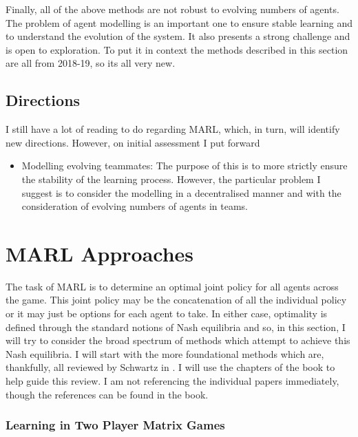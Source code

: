 \documentclass[preprint,8pt]{report}
\begin{document}
Finally, all of the above methods are not robust to evolving numbers of agents. The problem of agent modelling is an important one to ensure stable learning and to understand the evolution of the system. It also presents a strong challenge and is open to exploration. To put it in context the methods described in this section are all from 2018-19, so its all very new.

\subsection{Directions}

I still have a lot of reading to do regarding MARL, which, in turn, will identify new directions. However, on initial assessment I put forward

\begin{itemize}
    \item Modelling evolving teammates: The purpose of this is to more strictly ensure the stability of the learning process. However, the particular problem I suggest is to consider the modelling in a decentralised manner and with the consideration of evolving numbers of agents in teams.
\end{itemize}


\section{MARL Approaches}

The task of MARL is to determine an optimal joint policy for all agents across the game. This joint policy may be the concatenation of all the individual policy or it may just be options for each agent to take. In either case, optimality is defined through the standard notions of Nash equilibria and so, in this section, I will try to consider the broad spectrum of methods which attempt to achieve this Nash equilibria. I will start with the more foundational methods which are, thankfully, all reviewed by Schwartz in  \cite{SchwartzMulti-agentApproach}. I will use the chapters of the book to help guide this review. I am not referencing the individual papers immediately, though the references can be found in the book.

\subsubsection*{Learning in Two Player Matrix Games}
\end{document}
